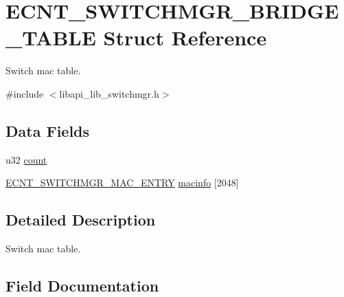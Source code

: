 \hypertarget{structECNT__SWITCHMGR__BRIDGE__TABLE}{}\section{E\+C\+N\+T\+\_\+\+S\+W\+I\+T\+C\+H\+M\+G\+R\+\_\+\+B\+R\+I\+D\+G\+E\+\_\+\+T\+A\+B\+LE Struct Reference}
\label{structECNT__SWITCHMGR__BRIDGE__TABLE}


Switch mac table.  




{\ttfamily \#include $<$libapi\+\_\+lib\+\_\+switchmgr.\+h$>$}

\subsection*{Data Fields}
\begin{DoxyCompactItemize}
\item 
u32 \hyperlink{structECNT__SWITCHMGR__BRIDGE__TABLE_ab28534a785db5abaa4346093afbde2eb}{count}
\item 
\hyperlink{structECNT__SWITCHMGR__MAC__ENTRY}{E\+C\+N\+T\+\_\+\+S\+W\+I\+T\+C\+H\+M\+G\+R\+\_\+\+M\+A\+C\+\_\+\+E\+N\+T\+RY} \hyperlink{structECNT__SWITCHMGR__BRIDGE__TABLE_a365c6290dd319aa8a2e005a2d3fcf2ae}{macinfo} \mbox{[}2048\mbox{]}
\end{DoxyCompactItemize}


\subsection{Detailed Description}
Switch mac table. 

\subsection{Field Documentation}
\mbox{\label{structECNT__SWITCHMGR__BRIDGE__TABLE_ab28534a785db5abaa4346093afbde2eb}} 
